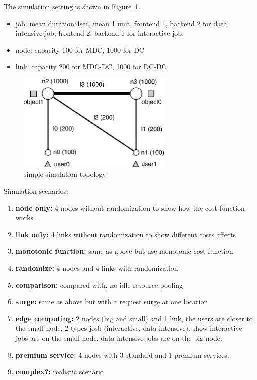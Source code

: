 
The simulation setting is shown in Figure~\ref{fig:topology-simple}.
\begin{itemize}
  \item		job: mean duration:4sec, mean 1 unit,
        frontend 1, backend 2 for data intensive job,
        frontend 2, backend 1 for interactive job,
  \item		node: capacity 100 for MDC, 1000 for DC
  \item		link: capacity 200 for MDC-DC, 1000 for DC-DC
\end{itemize}

\begin{figure}[htb]
  \begin{center}
    \includegraphics[width=7.5cm,clip]{topology-simple.pdf}
    \vspace{-2.0ex}
    \caption{simple simulation topology}
    \label{fig:topology-simple}
  \end{center}
\end{figure}

Simulation scenarios:
\begin{enumerate}
  \item	{\bf node only:} 4 nodes without randomization to show how the
        cost function works
  \item	{\bf link only:} 4 links without randomization to show
        different costs affects
  \item	{\bf monotonic function:} same as above but use monotonic cost
        function.
  \item	{\bf randomize:} 4 nodes and 4 links with randomization
  \item {\bf comparison:} compared with, no idle-resource pooling
  \item	{\bf surge:} same as above but with a request surge at one location
  \item	{\bf edge computing:} 2 nodes (big and small) and 1 link, the
    users are closer to the small node. 2 types josb (interactive,
    data intensive).  show interactive jobs are on the small node,
    data intensive jobs are on the big node.
  \item {\bf premium service:} 4 nodes with 3 standard and 1 premium services.
  \item	{\bf complex?:} realistic scenario
\end{enumerate}
